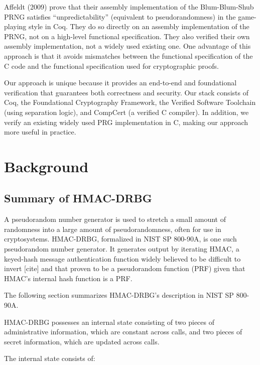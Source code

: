\documentclass[12pt,lot, lof]{puthesis}
\begin{document}
Affeldt (2009) prove that their assembly implementation of the Blum-Blum-Shub PRNG satisfies ``unpredictability'' (equivalent to pseudorandomness) in the game-playing style in Coq. They do so directly on an assembly implementation of the PRNG, not on a high-level functional specification. They also verified their own assembly implementation, not a widely used existing one. One advantage of this approach is that it avoids mismatches between the functional specification of the C code and the functional specification used for cryptographic proofs.

Our approach is unique because it provides an end-to-end and foundational verification that guarantees both correctness and security. Our stack consists of Coq, the Foundational Cryptography Framework, the Verified Software Toolchain (using separation logic), and CompCert (a verified C compiler). In addition, we verify an existing widely used PRG implementation in C, making our approach more useful in practice. 



\chapter{Background}

\section{Summary of HMAC-DRBG}
A pseudorandom number generator is used to stretch a small amount of randomness into a large amount of pseudorandomness, often for use in cryptosystems. HMAC-DRBG, formalized in NIST SP 800-90A, is one such pseudorandom number generator. It generates output by iterating HMAC, a keyed-hash message authentication function widely believed to be difficult to invert [cite] and that proven to be a pseudorandom function (PRF) given that HMAC's internal hash function is a PRF. %

The following section summarizes HMAC-DRBG's description in NIST SP 800-90A.

HMAC-DRBG possesses an internal state consisting of two pieces of administrative information, which are constant across calls, and two pieces of secret information, which are updated across calls.

The internal state consists of:
\end{document}
